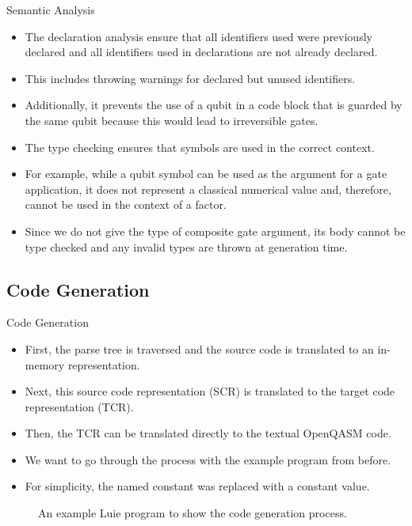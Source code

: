 \begin{frame}{Semantic Analysis}
    \begin{itemize}
        \item The declaration analysis ensure that all identifiers used were previously declared and all identifiers used in declarations are not already declared.
        \item This includes throwing warnings for declared but unused identifiers.
        \item Additionally, it prevents the use of a qubit in a code block that is guarded by the same qubit because this would lead to irreversible gates.
        \item The type checking ensures that symbols are used in the correct context.
        \item For example, while a qubit symbol can be used as the argument for a gate application, it does not represent a classical numerical value and, therefore, cannot be used in the context of a factor.
        \item Since we do not give the type of composite gate argument, its body cannot be type checked and any invalid types are thrown at generation time. 
    \end{itemize}
\end{frame}

\subsection{Code Generation}
\begin{frame}{Code Generation}
    \begin{itemize}
        \item First, the parse tree is traversed and the source code is translated to an in-memory representation.
        \item Next, this source code representation (SCR) is translated to the target code representation (TCR).
        \item Then, the TCR can be translated directly to the textual OpenQASM code.
        \item We want to go through the process with the example program from before.
        \item For simplicity, the named constant was replaced with a constant value.
    \end{itemize}
    \begin{figure}
        \centering
        
        \caption{An example Luie program to show the code generation process.}
    \end{figure}
\end{frame}

